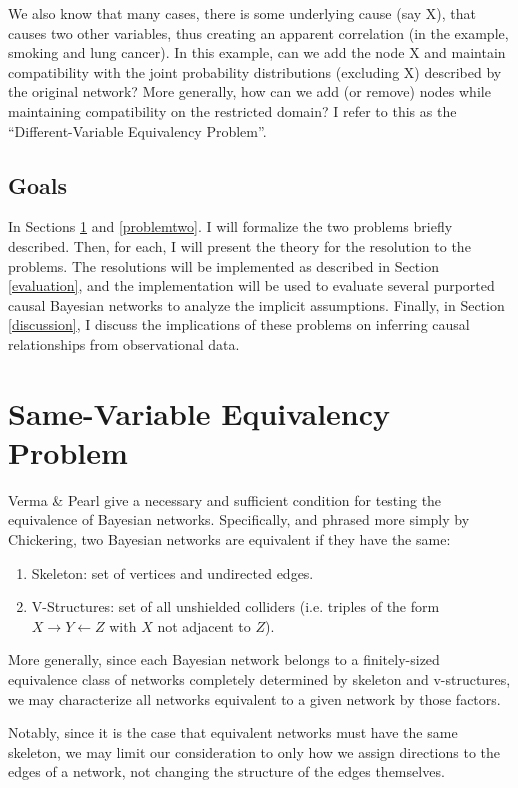 \documentclass{article}
\newcommand{\problemone}{Same-Variable Equivalency Problem}
\newcommand{\problemtwo}{Different-Variable Equivalency Problem}
\begin{document}
	We also know that many cases, there is some underlying cause (say X), that causes two other variables, thus creating an apparent correlation (in the example, smoking and lung cancer). In this example, can we add the node X and maintain compatibility with the joint probability distributions (excluding X) described by the original network? More generally, how can we add (or remove) nodes while maintaining compatibility on the restricted domain? I refer to this as the ``\problemtwo''.
	
	\subsection{Goals}
	In Sections \ref{problemone} and \ref{problemtwo}. I will formalize the two problems briefly described.
	Then, for each, I will present the theory for the resolution to the problems.
	The resolutions will be implemented as described in Section \ref{evaluation}, and the implementation will be used to evaluate several purported causal Bayesian networks to analyze the implicit assumptions.
	Finally, in Section \ref{discussion}, I discuss the implications of these problems on inferring causal relationships from observational data.


	\section{\problemone}
	\label{problemone}
	
	Verma \& Pearl\cite{verma2013equivalence} give a necessary and sufficient condition for testing the equivalence of Bayesian networks.
	Specifically, and phrased more simply by Chickering\cite{chickering2013transformational}, two Bayesian networks are equivalent if they have the same:
	\begin{enumerate}
		\item Skeleton: set of vertices and undirected edges.
		\item V-Structures: set of all unshielded colliders (i.e. triples of the form $X \rightarrow Y \leftarrow Z$ with $X$ not adjacent to $Z$).
	\end{enumerate}
	More generally, since each Bayesian network belongs to a finitely-sized equivalence class of networks completely determined by skeleton and v-structures, we may characterize all networks equivalent to a given network by those factors.
	
	Notably, since it is the case that equivalent networks must have the same skeleton, we may limit our consideration to only how we assign directions to the edges of a network, not changing the structure of the edges themselves.
	
\end{document}

